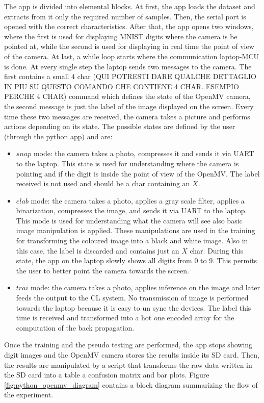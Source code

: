 \documentclass[12pt]{report}
\begin{document}
The app is divided into elemental blocks. At first, the app loads the dataset and extracts from it only the required number of samples. Then, the serial port is opened with the correct characteristics. After that, the app opens two windows, where the first is used for displaying MNIST digits where the camera is be pointed at, while the second is used for displaying in real time the point of view of the camera. At last, a while loop starts where the communication laptop-MCU is done. At every single step the laptop sends two messages to the camera. The first contains a small 4 char (QUI POTRESTI DARE QUALCHE DETTAGLIO IN PIU SU QUESTO COMANDO CHE CONTIENE 4 CHAR. ESEMPIO PERCHE 4 CHAR) command which defines the state of the OpenMV camera, the second message is just the label of the image displayed on the screen. Every time these two messages are received, the camera takes a picture and performs actions depending on its state. The possible states are defined by the user (through the python app) and are: 

\begin{itemize}
	\item $snap$ mode: the camera takes a photo, compresses it and sends it via UART to the laptop. This state is used for understanding where the camera is pointing and if the digit is inside the point of view of the OpenMV. The label received is not used and should be a char containing an $X$.
	\item $elab$ mode: the camera takes a photo, applies a gray scale filter, applies a binarization, compresses the image, and sends it via UART to the laptop. This mode is used for understanding what the camera will see also basic image manipulation is applied. These manipulations are used in the training for transforming the coloured image into a black and white image. Also in this case, the label is discarded and contains just an $X$ char. During this state, the app on the laptop slowly shows all digits from 0 to 9. This permits the user to better point the camera towards the screen.
	\item $trai$ mode: the camera takes a photo, applies inference on the image and later feeds the output to the CL system. No transmission of image is performed towards the laptop because it is easy to un sync the devices. The label this time is received and transformed into a hot one encoded array for the computation of the back propagation.
\end{itemize}

Once the training and the pseudo testing are performed, the app stops showing digit images and the OpenMV camera stores the results inside its SD card. Then, the results are manipulated by a script that transforms the raw data written in the SD card into a table a confusion matrix and bar plots. Figure \ref{fig:python_openmv_diagram} contains a block diagram summarizing the flow of the experiment. 
\end{document}
